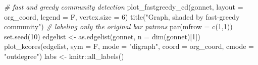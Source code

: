 \documentclass[12pt]{article}
\newenvironment{Shaded}{\begin{snugshade}}{\end{snugshade}}
\newcommand{\AttributeTok}[1]{\textcolor[rgb]{0.77,0.63,0.00}{#1}}
\newcommand{\CommentTok}[1]{\textcolor[rgb]{0.56,0.35,0.01}{\textit{#1}}}
\newcommand{\DecValTok}[1]{\textcolor[rgb]{0.00,0.00,0.81}{#1}}
\newcommand{\FunctionTok}[1]{\textcolor[rgb]{0.00,0.00,0.00}{#1}}
\newcommand{\NormalTok}[1]{#1}
\newcommand{\OtherTok}[1]{\textcolor[rgb]{0.56,0.35,0.01}{#1}}
\newcommand{\SpecialCharTok}[1]{\textcolor[rgb]{0.00,0.00,0.00}{#1}}
\newcommand{\StringTok}[1]{\textcolor[rgb]{0.31,0.60,0.02}{#1}}
\begin{document}
\begin{Shaded}
\begin{Highlighting}[]
\CommentTok{\# fast and greedy community detection}
\FunctionTok{plot\_fastgreedy\_cd}\NormalTok{(gonnet, }\AttributeTok{layout =}\NormalTok{ org\_coord, }
                   \AttributeTok{legend =}\NormalTok{ F, }\AttributeTok{vertex.size =} \DecValTok{6}\NormalTok{)}
\FunctionTok{title}\NormalTok{(}\StringTok{"Graph, shaded by fast{-}greedy community"}\NormalTok{)}
\CommentTok{\# labeling only the original bar patrons}
\FunctionTok{par}\NormalTok{(}\AttributeTok{mfrow =} \FunctionTok{c}\NormalTok{(}\DecValTok{1}\NormalTok{,}\DecValTok{1}\NormalTok{))}
\FunctionTok{set.seed}\NormalTok{(}\DecValTok{10}\NormalTok{)}
\NormalTok{edgelist }\OtherTok{\textless{}{-}} \FunctionTok{as.edgelist}\NormalTok{(gonnet, }\AttributeTok{n =} \FunctionTok{dim}\NormalTok{(gonnet)[}\DecValTok{1}\NormalTok{])}
\FunctionTok{plot\_kcores}\NormalTok{(edgelist, }\AttributeTok{sym =}\NormalTok{ F, }\AttributeTok{mode =} \StringTok{"digraph"}\NormalTok{, }
            \AttributeTok{coord =}\NormalTok{ org\_coord,}
            \AttributeTok{cmode =} \StringTok{"outdegree"}\NormalTok{)}
\NormalTok{labs }\OtherTok{\textless{}{-}}\NormalTok{ knitr}\SpecialCharTok{::}\FunctionTok{all\_labels}\NormalTok{()}
\end{Highlighting}
\end{Shaded}




\end{document}

